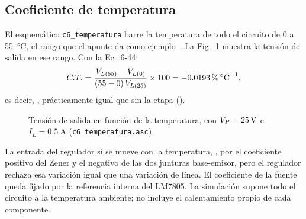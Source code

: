 \subsection{Coeficiente de temperatura}
El esquemático \texttt{c6\_temperatura} barre la temperatura de todo el circuito de \SI{0}{} a \SI{55}{\celsius}, el rango que el apunte da como ejemplo~\cite[Sec.~6-6-3d]{ap2}. La Fig.~\ref{fig:temperatura} muestra la tensión de salida en ese rango. Con la Ec.~6-44:
\begin{equation}
    C.T. = \frac{V_{L(55)} - V_{L(0)}}{(55 - 0)\,V_{L(25)}} \times 100 = \valu{4}{\simCTCon}{\percent\per\celsius},
\end{equation}
es decir, , prácticamente igual que sin la etapa ().

\begin{figure}[!htb]
\centering
{}
\caption{Tensión de salida en función de la temperatura, con $V_{P} = \SI{25}{\volt}$ e $I_L = \SI{0,5}{\ampere}$ (\texttt{c6\_temperatura.asc}).}
\label{fig:temperatura}
\end{figure}

La entrada del regulador sí se mueve con la temperatura, , por el coeficiente positivo del Zener y el negativo de las dos junturas base-emisor, pero el regulador rechaza esa variación igual que una variación de línea. El coeficiente de la fuente queda fijado por la referencia interna del LM7805. La simulación supone todo el circuito a la temperatura ambiente; no incluye el calentamiento propio de cada componente.

